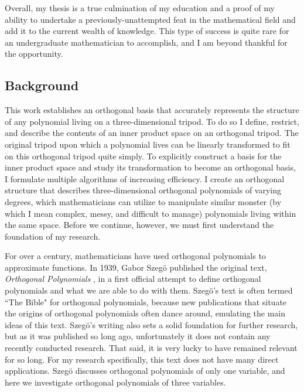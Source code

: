 \documentclass[letterpaper, 12pt]{article}
\begin{document}
Overall, my thesis is a true culmination of my education and a proof of my ability to undertake a previously-unattempted feat in the mathematical field and add it to the current wealth of knowledge. This type of success is quite rare for an undergraduate mathematician to accomplish, and I am beyond thankful for the opportunity. 







\newpage
\begin{centering}\section{Background}\end{centering}

This work establishes an orthogonal basis that accurately represents the structure of any polynomial living on a three-dimensional tripod. To do so I define, restrict, and describe the contents of an inner product space on an orthogonal tripod. The original tripod upon which a polynomial lives can be linearly transformed to fit on this orthogonal tripod quite simply. To explicitly construct a basis for the inner product space and study its transformation to become an orthogonal basis, I formulate multiple algorithms of increasing efficiency. I create an orthogonal structure that describes three-dimensional orthogonal polynomials of varying degrees, which mathematicians can utilize to manipulate similar monster (by which I mean complex, messy, and difficult to manage) polynomials living within the same space. Before we continue, however, we must first understand the foundation of my research.

For over a century, mathematicians have used orthogonal polynomials to approximate functions. In 1939, Gabor Szeg\"o published the original text, \textit{Orthogonal Polynomials} \cite{sze}, in a first official attempt to define orthogonal polynomials and what we are able to do with them. Szeg\"o's text is often termed ``The Bible" for orthogonal polynomials, because new publications that situate the origins of orthogonal polynomials often dance around, emulating the main ideas of this text. Szeg\"o's writing also sets a solid foundation for further research, but as it was published so long ago, unfortunately it does not contain any recently conducted research. That said, it is very lucky to have remained relevant for so long. For my research specifically, this text does not have many direct applications. Szeg\"o discusses orthogonal polynomials of only one variable, and here we investigate orthogonal polynomials of three variables.
\end{document}
